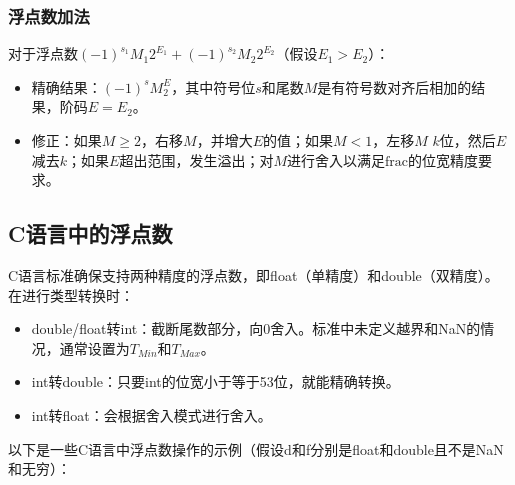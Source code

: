 \documentclass[a4paper, 12pt, UTF8]{ctexart}
\begin{document}
\subsubsection{浮点数加法}
对于浮点数\((-1)^{s_1}M_1 2^{E_1}+(-1)^{s_2}M_2 2^{E_2}\)（假设\(E_1>E_2\)）：
\begin{itemize}
    \item 精确结果：\((-1)^{s}M_2^{E}\)，其中符号位\(s\)和尾数\(M\)是有符号数对齐后相加的结果，阶码\(E = E_2\)。
    \item 修正：如果\(M\geq2\)，右移\(M\)，并增大\(E\)的值；如果\(M<1\)，左移\(M\) \(k\)位，然后\(E\)减去\(k\)；如果\(E\)超出范围，发生溢出；对\(M\)进行舍入以满足\(\text{frac}\)的位宽精度要求。
\end{itemize}

\subsection{C语言中的浮点数}
C语言标准确保支持两种精度的浮点数，即float（单精度）和double（双精度）。在进行类型转换时：
\begin{itemize}
    \item double/float转int：截断尾数部分，向0舍入。标准中未定义越界和NaN的情况，通常设置为\(T_{Min}\)和\(T_{Max}\)。
    \item int转double：只要int的位宽小于等于53位，就能精确转换。
    \item int转float：会根据舍入模式进行舍入。
\end{itemize}

以下是一些C语言中浮点数操作的示例（假设d和f分别是float和double且不是NaN和无穷）：
\end{document}
